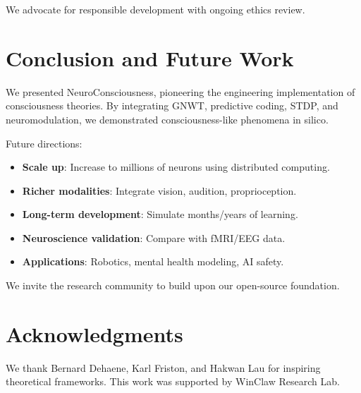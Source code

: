 \documentclass[twocolumn,10pt]{article}
\begin{document}
We advocate for responsible development with ongoing ethics review.

\section{Conclusion and Future Work}

We presented NeuroConsciousness, pioneering the engineering implementation of consciousness theories. By integrating GNWT, predictive coding, STDP, and neuromodulation, we demonstrated consciousness-like phenomena in silico.

Future directions:
\begin{itemize}
    \item \textbf{Scale up}: Increase to millions of neurons using distributed computing.
    \item \textbf{Richer modalities}: Integrate vision, audition, proprioception.
    \item \textbf{Long-term development}: Simulate months/years of learning.
    \item \textbf{Neuroscience validation}: Compare with fMRI/EEG data.
    \item \textbf{Applications}: Robotics, mental health modeling, AI safety.
\end{itemize}

We invite the research community to build upon our open-source foundation.

\section*{Acknowledgments}

We thank Bernard Dehaene, Karl Friston, and Hakwan Lau for inspiring theoretical frameworks. This work was supported by WinClaw Research Lab.




\end{document}
